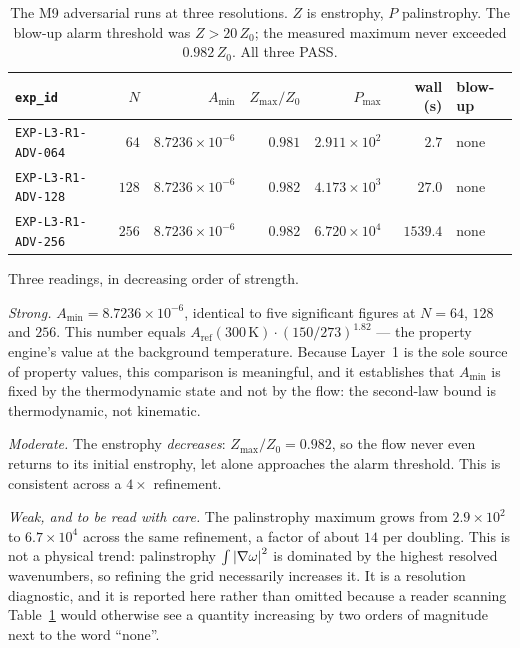\begin{table}[ht]
\centering
\small
\begin{tabular}{@{}l r r r r r l@{}}
\toprule
\texttt{exp\_id} & \(N\) & \(A_{\min}\) & \(Z_{\max}/Z_0\) &
\(P_{\max}\) & wall (s) & blow-up \\
\midrule
\texttt{EXP-L3-R1-ADV-064} & \(64\) & \(8.7236\!\times\!10^{-6}\) & \(0.981\) & \(2.911\!\times\!10^{2}\) & \(2.7\) & none \\
\texttt{EXP-L3-R1-ADV-128} & \(128\) & \(8.7236\!\times\!10^{-6}\) & \(0.982\) & \(4.173\!\times\!10^{3}\) & \(27.0\) & none \\
\texttt{EXP-L3-R1-ADV-256} & \(256\) & \(8.7236\!\times\!10^{-6}\) & \(0.982\) & \(6.720\!\times\!10^{4}\) & \(1539.4\) & none \\
\bottomrule
\end{tabular}
\caption[The M9 blow-up search]{The M9 adversarial runs at three resolutions.
\(Z\) is enstrophy, \(P\) palinstrophy. The blow-up alarm threshold was
\(Z>20\,Z_0\); the measured maximum never exceeded \(0.982\,Z_0\). All three
\textsf{PASS}.}
\label{tab:m9}
\end{table}

Three readings, in decreasing order of strength.

\emph{Strong.} \(A_{\min}=8.7236\times10^{-6}\), identical to five
significant figures at \(N=64\), \(128\) and \(256\). This number equals
\(A_{\mathrm{ref}}(300\,\mathrm{K})\cdot(150/273)^{1.82}\) --- the property
engine's value at the background temperature. Because Layer~1 is the sole
source of property values, this comparison is meaningful, and it establishes
that \(A_{\min}\) is fixed by the thermodynamic state and not by the flow: the
second-law bound is thermodynamic, not kinematic.

\emph{Moderate.} The enstrophy \emph{decreases}: \(Z_{\max}/Z_0=0.982\), so
the flow never even returns to its initial enstrophy, let alone approaches the
alarm threshold. This is consistent across a \(4\times\) refinement.

\emph{Weak, and to be read with care.} The palinstrophy maximum grows from
\(2.9\times10^{2}\) to \(6.7\times10^{4}\) across the same refinement, a
factor of about \(14\) per doubling. This is not a physical trend: palinstrophy
\(\int\left|\nabla\omega\right|^2\) is dominated by the highest resolved wavenumbers,
so refining the grid necessarily increases it. It is a resolution diagnostic,
and it is reported here rather than omitted because a reader scanning
Table~\ref{tab:m9} would otherwise see a quantity increasing by two orders of
magnitude next to the word ``none''.

